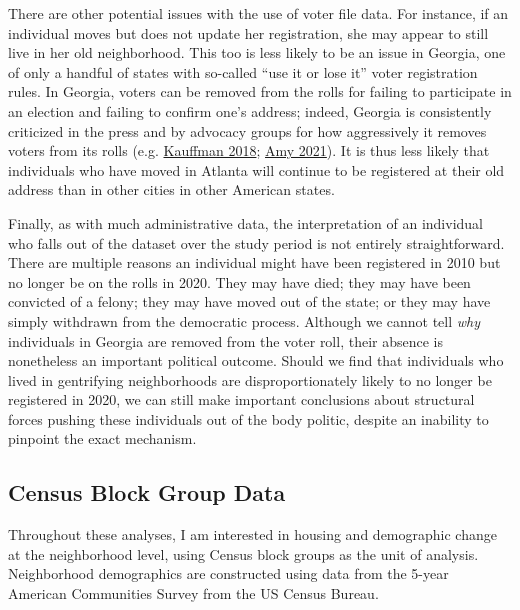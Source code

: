 \documentclass[
  12pt,
]{article}
\begin{document}
There are other potential issues with the use of voter file data. For instance, if an individual moves but does not update her registration, she may appear to still live in her old neighborhood. This too is less likely to be an issue in Georgia, one of only a handful of states with so-called ``use it or lose it'' voter registration rules. In Georgia, voters can be removed from the rolls for failing to participate in an election and failing to confirm one's address; indeed, Georgia is consistently criticized in the press and by advocacy groups for how aggressively it removes voters from its rolls (e.g. \protect\hyperlink{ref-Kauffman2018}{Kauffman 2018}; \protect\hyperlink{ref-Amy2021}{Amy 2021}). It is thus less likely that individuals who have moved in Atlanta will continue to be registered at their old address than in other cities in other American states.

Finally, as with much administrative data, the interpretation of an individual who falls out of the dataset over the study period is not entirely straightforward. There are multiple reasons an individual might have been registered in 2010 but no longer be on the rolls in 2020. They may have died; they may have been convicted of a felony; they may have moved out of the state; or they may have simply withdrawn from the democratic process. Although we cannot tell \emph{why} individuals in Georgia are removed from the voter roll, their absence is nonetheless an important political outcome. Should we find that individuals who lived in gentrifying neighborhoods are disproportionately likely to no longer be registered in 2020, we can still make important conclusions about structural forces pushing these individuals out of the body politic, despite an inability to pinpoint the exact mechanism.

\hypertarget{census-block-group-data}{%
\subsection*{Census Block Group Data}\label{census-block-group-data}}

Throughout these analyses, I am interested in housing and demographic change at the neighborhood level, using Census block groups as the unit of analysis. Neighborhood demographics are constructed using data from the 5-year American Communities Survey from the US Census Bureau.
\end{document}
